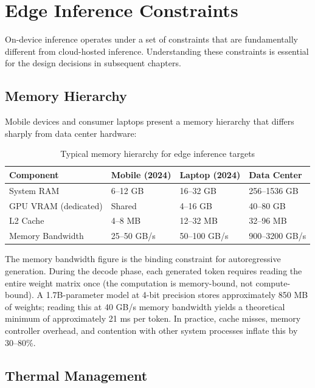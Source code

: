 \documentclass[12pt, letterpaper, twoside]{report}
\begin{document}
\section{Edge Inference Constraints}
\label{sec:edge_constraints}

On-device inference operates under a set of constraints that are fundamentally different from cloud-hosted inference. Understanding these constraints is essential for the design decisions in subsequent chapters.

\subsection{Memory Hierarchy}
\label{subsec:memory}

Mobile devices and consumer laptops present a memory hierarchy that differs sharply from data center hardware:

\begin{table}[H]
\centering
\caption{Typical memory hierarchy for edge inference targets}
\label{tab:memory_hierarchy}
\begin{tabularx}{\textwidth}{@{}lXXX@{}}
\toprule
\textbf{Component} & \textbf{Mobile (2024)} & \textbf{Laptop (2024)} & \textbf{Data Center} \\
\midrule
System RAM & 6--12 GB & 16--32 GB & 256--1536 GB \\
GPU VRAM (dedicated) & Shared & 4--16 GB & 40--80 GB \\
L2 Cache & 4--8 MB & 12--32 MB & 32--96 MB \\
Memory Bandwidth & 25--50 GB/s & 50--100 GB/s & 900--3200 GB/s \\
\bottomrule
\end{tabularx}
\end{table}

The memory bandwidth figure is the binding constraint for autoregressive generation. During the decode phase, each generated token requires reading the entire weight matrix once (the computation is memory-bound, not compute-bound). A 1.7B-parameter model at 4-bit precision stores approximately 850 MB of weights; reading this at 40 GB/s memory bandwidth yields a theoretical minimum of approximately 21 ms per token. In practice, cache misses, memory controller overhead, and contention with other system processes inflate this by 30--80\%.

\subsection{Thermal Management}
\label{subsec:thermal}
\end{document}
